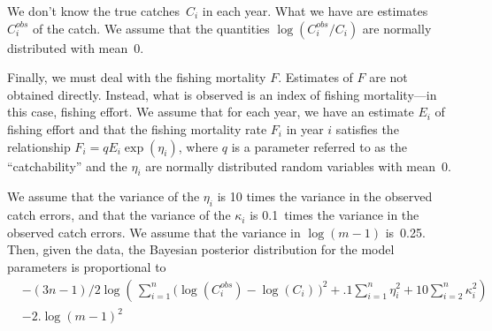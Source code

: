 \documentclass{admbmanual}
\newcommand{\cobs}{C^{obs}_i}
\begin{document}
We don't know the true catches~$C_i$ in each year. What we have are
estimates $\cobs$ of the catch. We assume that the
quantities $\log(\cobs/C_i)$ are normally distributed with mean~0.

Finally, we must deal with the fishing mortality $F$.  Estimates of
$F$ are not obtained directly. Instead, what is observed is an index
of fishing mortality---in this case, fishing effort. We assume that for each
year, we have an estimate $E_i$ of fishing effort and that
the fishing mortality rate $F_i$ in year $i$ satisfies the relationship
$F_i=qE_i\exp(\eta_i)$, where $q$ is a parameter referred to as the 
``catchability'' and the $\eta_i$ are normally distributed random
variables with mean~0.
 
We assume that the variance of the $\eta_i$ is 10 times the 
variance in the observed catch errors, and that the
variance of the $\kappa_i$ is 0.1~times the variance in the
observed catch errors. We assume that the variance in
$\log(m-1)$ is~0.25. Then, given the data,
the Bayesian posterior distribution for the model parameters is
proportional to 
\begin{align}
  \nonumber &-(3n-1)/2\log\left(\,\sum_{i=1}^n \big(\log(\cobs)-\log(C_i)\,\big)^2
      +.1\sum_{i=1}^n\eta_i^2  +10\sum_{i=2}^n\kappa_i^2\right)\\
   &-2.\log(m-1)^2
  \label{ch1:xx7}
\end{align} 
     
\end{document}

